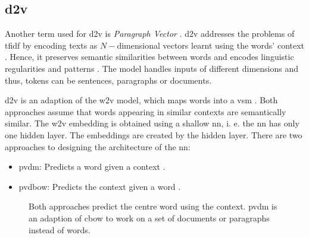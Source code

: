 \subsection{\acl*{d2v}}\label{subsec:doc2vec}

Another term used for \ac{d2v} is \textit{Paragraph Vector} \cite{clusteringDocs2020, SentRep2014}.
\ac{d2v} addresses the problems of \ac{tfidf} by encoding texts as $N-$dimensional vectors learnt using the words' context \cite{clusteringDocs2020}.
Hence, it preserves semantic similarities between words and encodes linguistic regularities and patterns \cite{SkipGram2013}.
The model handles inputs of different dimensions and thus, tokens can be sentences, paragraphs or documents.

\ac{d2v} is an adaption of the \ac{w2v} model, which maps words into a \ac{vsm} \cite{clusteringDocs2020}.
Both approaches assume that words appearing in similar contexts are semantically similar. %
The \ac{w2v} embedding is obtained using a shallow \ac{nn}, i. e. the \ac{nn} has only one hidden layer.
The embeddings are created by the hidden layer.
There are two approaches to designing the architecture of the \ac{nn}:
\begin{itemize}
    \item \ac{pvdm}: 
        Predicts a word given a context \cite{SentRep2014, WordRep2013}.
    \item \ac{pvdbow}: 
        Predicts the context given a word \cite{EmbDist2015, SkipGram2013, SentRep2014}.
\end{itemize}


\begin{figure}%
    \centering
    \qquad
    \caption[\ac{cbow} and \ac{pvdm} architecture]{Both approaches predict the centre word using the context.
    \ac{pvdm} is an adaption of \ac{cbow} to work on a set of documents or paragraphs instead of words.
    }%
    \label{fig:pvdm}%
\end{figure}
 
